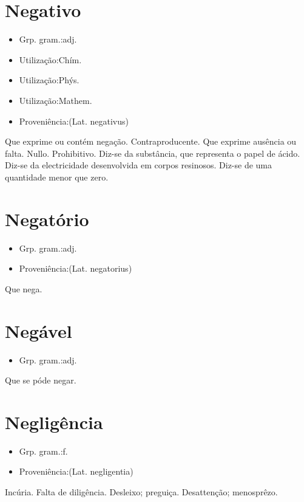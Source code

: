 \section{Negativo}
\begin{itemize}
\item {Grp. gram.:adj.}
\end{itemize}
\begin{itemize}
\item {Utilização:Chím.}
\end{itemize}
\begin{itemize}
\item {Utilização:Phýs.}
\end{itemize}
\begin{itemize}
\item {Utilização:Mathem.}
\end{itemize}
\begin{itemize}
\item {Proveniência:(Lat. \textunderscore negativus\textunderscore )}
\end{itemize}
Que exprime ou contém negação.
Contraproducente.
Que exprime ausência ou falta.
Nullo.
Prohibitivo.
Diz-se da substância, que representa o papel de ácido.
Diz-se da electricidade desenvolvida em corpos resinosos.
Diz-se de uma quantidade menor que zero.
\section{Negatório}
\begin{itemize}
\item {Grp. gram.:adj.}
\end{itemize}
\begin{itemize}
\item {Proveniência:(Lat. \textunderscore negatorius\textunderscore )}
\end{itemize}
Que nega.
\section{Negável}
\begin{itemize}
\item {Grp. gram.:adj.}
\end{itemize}
Que se póde negar.
\section{Negligência}
\begin{itemize}
\item {Grp. gram.:f.}
\end{itemize}
\begin{itemize}
\item {Proveniência:(Lat. \textunderscore negligentia\textunderscore )}
\end{itemize}
Incúria.
Falta de diligência.
Desleixo; preguiça.
Desattenção; menosprêzo.
